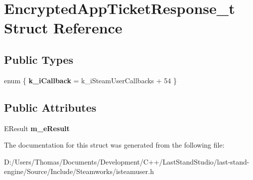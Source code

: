 \hypertarget{structEncryptedAppTicketResponse__t}{}\section{Encrypted\+App\+Ticket\+Response\+\_\+t Struct Reference}
\label{structEncryptedAppTicketResponse__t}
\subsection*{Public Types}
\begin{DoxyCompactItemize}
\item 
\hypertarget{structEncryptedAppTicketResponse__t_a7c2a85527713bf477be828c3da1f98b4}{}enum \{ {\bfseries k\+\_\+i\+Callback} = k\+\_\+i\+Steam\+User\+Callbacks + 54
 \}\label{structEncryptedAppTicketResponse__t_a7c2a85527713bf477be828c3da1f98b4}

\end{DoxyCompactItemize}
\subsection*{Public Attributes}
\begin{DoxyCompactItemize}
\item 
\hypertarget{structEncryptedAppTicketResponse__t_a5bff1bf8e04c0d9d61277d1bd4da52b8}{}E\+Result {\bfseries m\+\_\+e\+Result}\label{structEncryptedAppTicketResponse__t_a5bff1bf8e04c0d9d61277d1bd4da52b8}

\end{DoxyCompactItemize}


The documentation for this struct was generated from the following file\+:\begin{DoxyCompactItemize}
\item 
D\+:/\+Users/\+Thomas/\+Documents/\+Development/\+C++/\+Last\+Stand\+Studio/last-\/stand-\/engine/\+Source/\+Include/\+Steamworks/isteamuser.\+h\end{DoxyCompactItemize}
